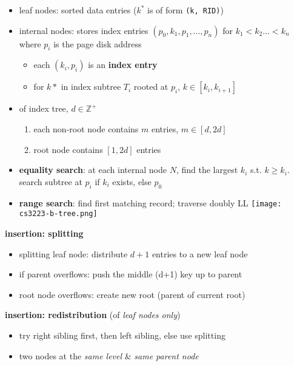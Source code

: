 \documentclass[10pt, landscape]{article}
\begin{document}
\begin{multicols*}{4}
  \begin{itemize}
    \item leaf nodes: sorted data entries ($k^*$ is of form \texttt{(k, RID)})
    \item internal nodes: stores index entries $(p_0, k_1, p_1, \dots, p_n)$ for $k_1 < k_2 \dots <k_n$ where $p_i$ is the page disk address
          \begin{itemize}
            \item each $(k_i, p_i)$ is an \textbf{index entry}
            \item for $k*$ in index subtree $T_i$ rooted at $p_i$, $k \in [k_i, k_{i+1}]$
          \end{itemize}
    \item {} of index tree, $d \in \mathbb{Z}^+$
          \begin{enumerate}
            \item each non-root node contains $m$ entries, $m \in [d, 2d]$
            \item root node contains $[1, 2d]$ entries
          \end{enumerate}
    \item \textbf{equality search}: at each internal node $N$, find the largest $k_i$ s.t. $k \geq k_i$. search subtree at $p_i$ if $k_i$ exists, else $p_0$
    \item \textbf{range search}: find first matching record; traverse doubly LL
          \texttt{[image: cs3223-b-tree.png]}
  \end{itemize}

  \textbf{insertion: splitting}
  \begin{itemize}
    \item splitting leaf node: distribute $d+1$ entries to a new leaf node
    \item if parent overflows: push the middle (d+1) key up to parent
    \item root node overflows: create new root (parent of current root)
  \end{itemize}

  \textbf{insertion: redistribution} (of \textit{leaf nodes only})
  \begin{itemize}
    \item try right sibling first, then left sibling, else use splitting
    \item {} two nodes at the \textit{same level} \& \textit{same parent node}
  \end{itemize}


\end{multicols*}
\end{document}
